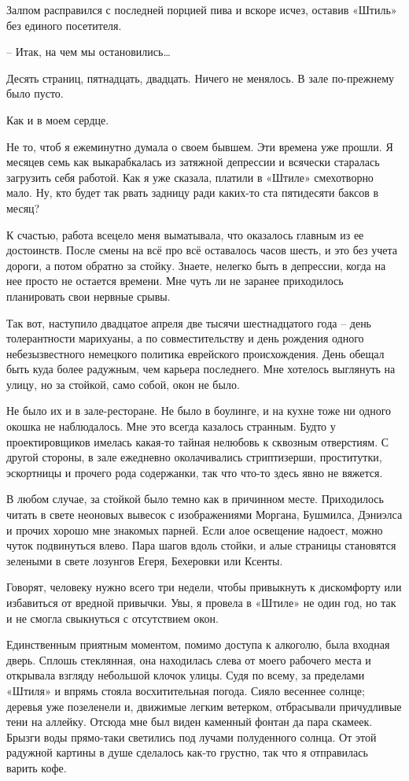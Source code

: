 \documentclass[
]{book}
\begin{document}
Залпом расправился с последней порцией пива и вскоре исчез, оставив «Штиль» без единого посетителя.

-- Итак, на чем мы остановились\ldots{}

Десять страниц, пятнадцать, двадцать. Ничего не менялось. В зале по-прежнему было пусто.

Как и в моем сердце.

Не то, чтоб я ежеминутно думала о своем бывшем. Эти времена уже прошли. Я месяцев семь как выкарабкалась из затяжной депрессии и всячески старалась загрузить себя работой. Как я уже сказала, платили в «Штиле» смехотворно мало. Ну, кто будет так рвать задницу ради каких-то ста пятидесяти баксов в месяц?

К счастью, работа всецело меня выматывала, что оказалось главным из ее достоинств. После смены на всё про всё оставалось часов шесть, и это без учета дороги, а потом обратно за стойку. Знаете, нелегко быть в депрессии, когда на нее просто не остается времени. Мне чуть ли не заранее приходилось планировать свои нервные срывы.

Так вот, наступило двадцатое апреля две тысячи шестнадцатого года -- день толерантности марихуаны, а по совместительству и день рождения одного небезызвестного немецкого политика еврейского происхождения. День обещал быть куда более радужным, чем карьера последнего. Мне хотелось выглянуть на улицу, но за стойкой, само собой, окон не было.

Не было их и в зале-ресторане. Не было в боулинге, и на кухне тоже ни одного окошка не наблюдалось. Мне это всегда казалось странным. Будто у проектировщиков имелась какая-то тайная нелюбовь к сквозным отверстиям. С другой стороны, в зале ежедневно околачивались стриптизерши, проститутки, эскортницы и прочего рода содержанки, так что что-то здесь явно не вяжется.

В любом случае, за стойкой было темно как в причинном месте. Приходилось читать в свете неоновых вывесок с изображениями Моргана, Бушмилса, Дэниэлса и прочих хорошо мне знакомых парней. Если алое освещение надоест, можно чуток подвинуться влево. Пара шагов вдоль стойки, и алые страницы становятся зелеными в свете лозунгов Егеря, Бехеровки или Ксенты.

Говорят, человеку нужно всего три недели, чтобы привыкнуть к дискомфорту или избавиться от вредной привычки. Увы, я провела в «Штиле» не один год, но так и не смогла свыкнуться с отсутствием окон.

Единственным приятным моментом, помимо доступа к алкоголю, была входная дверь. Сплошь стеклянная, она находилась слева от моего рабочего места и открывала взгляду небольшой клочок улицы. Судя по всему, за пределами «Штиля» и впрямь стояла восхитительная погода. Сияло весеннее солнце; деревья уже позеленели и, движимые легким ветерком, отбрасывали причудливые тени на аллейку. Отсюда мне был виден каменный фонтан да пара скамеек. Брызги воды прямо-таки светились под лучами полуденного солнца. От этой радужной картины в душе сделалось как-то грустно, так что я отправилась варить кофе.
\end{document}
